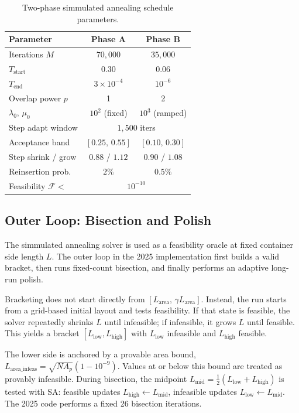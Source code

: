 \documentclass[10pt]{article}
\begin{document}
\begin{table}[t]
\centering\small
\setlength{\tabcolsep}{4.5pt}
\caption{Two-phase simmulated annealing schedule parameters.}
\label{tab:sa}
\begin{tabular}{lcc}
\toprule
Parameter & Phase A & Phase B \\
\midrule
Iterations $M$                & $70{,}000$       & $35{,}000$ \\
$T_{\mathrm{start}}$          & $0.30$           & $0.06$ \\
$T_{\mathrm{end}}$            & $3\times10^{-4}$ & $10^{-6}$ \\
Overlap power $p$             & 1                & 2 \\
$\lambda_0,\,\mu_0$           & $10^2$ (fixed)   & $10^3$ (ramped) \\
Step adapt window             & \multicolumn{2}{c}{$1{,}500$ iters} \\
Acceptance band               & $[0.25,\,0.55]$  & $[0.10,\,0.30]$ \\
Step shrink / grow            & $0.88$ / $1.12$  & $0.90$ / $1.08$ \\
Reinsertion prob.             & $2\%$            & $0.5\%$ \\
Feasibility $\mathcal{F} <$   & \multicolumn{2}{c}{$10^{-10}$} \\
\bottomrule
\end{tabular}
\end{table}

\subsection{Outer Loop: Bisection and Polish}

The simmulated annealing solver is used as a feasibility oracle at fixed
container side length $L$. The outer loop in the 2025 implementation first
builds a valid bracket, then runs fixed-count bisection, and finally performs
an adaptive long-run polish.

Bracketing does not start directly from
$[L_{\mathrm{area}},\,\gamma L_{\mathrm{area}}]$.
Instead, the run starts from a grid-based initial layout and tests feasibility.
If that state is feasible, the solver repeatedly shrinks $L$ until infeasible;
if infeasible, it grows $L$ until feasible.
This yields a bracket $[L_{\mathrm{low}}, L_{\mathrm{high}}]$ with
$L_{\mathrm{low}}$ infeasible and $L_{\mathrm{high}}$ feasible.

The lower side is anchored by a provable area bound,
$L_{\mathrm{area\_infeas}}=\sqrt{N A_p}(1-10^{-9})$.
Values at or below this bound are treated as provably infeasible.
During bisection, the midpoint
$L_{\mathrm{mid}}=\tfrac{1}{2}(L_{\mathrm{low}}+L_{\mathrm{high}})$
is tested with SA:
feasible updates $L_{\mathrm{high}}\leftarrow L_{\mathrm{mid}}$,
infeasible updates $L_{\mathrm{low}}\leftarrow L_{\mathrm{mid}}$.
The 2025 code performs a fixed 26 bisection iterations.
\end{document}
